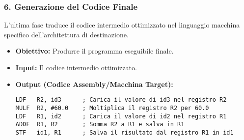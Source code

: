 \subsubsection{6. Generazione del Codice Finale}
L'ultima fase traduce il codice intermedio ottimizzato nel linguaggio macchina specifico dell'architettura di destinazione.
\begin{itemize}
    \item \textbf{Obiettivo:} Produrre il programma eseguibile finale.
    \item \textbf{Input:} Il codice intermedio ottimizzato.
    \item \textbf{Output (Codice Assembly/Macchina Target):}
    \begin{Verbatim}[frame=single, label=Codice Assembly di Esempio]
LDF   R2, id3      ; Carica il valore di id3 nel registro R2
MULF  R2, #60.0    ; Moltiplica il registro R2 per 60.0
LDF   R1, id2      ; Carica il valore di id2 nel registro R1
ADDF  R1, R2       ; Somma R2 a R1 e salva in R1
STF   id1, R1      ; Salva il risultato dal registro R1 in id1
    \end{Verbatim}
\end{itemize}
